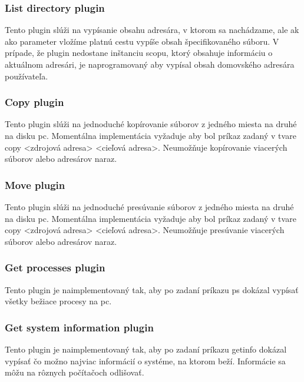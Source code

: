 {\subsubsection{List directory plugin}
\indent  Tento plugin slúži na vypísanie obsahu adresára, v ktorom sa nachádzame, ale ak ako parameter vložíme platnú cestu vypíše obsah špecifikovaného súboru. V prípade, že plugin nedostane inštanciu scopu, ktorý obsahuje informáciu o aktuálnom adresári, je naprogramovaný aby vypísal obsah domovského adresára používateľa.
\subsubsection{Copy plugin}
\indent  Tento plugin slúži na jednoduché kopírovanie súborov z jedného miesta na druhé na disku \acrshort{pc}. Momentálna implementácia vyžaduje aby bol príkaz zadaný v tvare copy <zdrojová adresa> <cieľová adresa>. Neumožňuje kopírovanie viacerých súborov alebo adresárov naraz.
\subsubsection{Move plugin}
\indent  Tento plugin slúži na jednoduché presúvanie súborov z jedného miesta na druhé na disku \acrshort{pc}. Momentálna implementácia vyžaduje aby bol príkaz zadaný v tvare copy <zdrojová adresa> <cieľová adresa>. Neumožňuje presúvanie viacerých súborov alebo adresárov naraz.
\subsubsection{Get processes plugin}
\indent Tento plugin je naimplementovaný tak, aby po zadaní príkazu ps dokázal vypísať všetky bežiace procesy na \acrshort{pc}.
\subsubsection{Get system information plugin}
\indent Tento plugin je naimplementovaný tak, aby po zadaní príkazu getinfo dokázal vypísať čo možno najviac informácií o systéme, na ktorom beží. Informácie sa môžu na rôznych počítačoch odlišovať.
}
